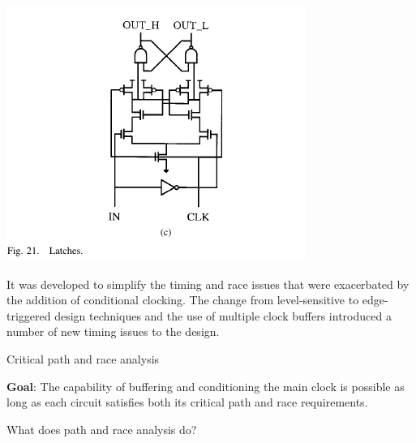 \documentclass[11pt]{article}
\begin{document}
\begin{enumerate}
\begin{center}
		\includegraphics[scale=0.5]{21264_latch.png}
	\end{center} 
	It was developed to simplify the timing and race issues that were exacerbated by the addition of conditional clocking.  The change from level-sensitive to edge-triggered design techniques and the use of multiple clock buffers introduced a number of new timing issues to the design.
\end{enumerate}

Critical path and race analysis

\textbf{Goal}: The capability of buffering and conditioning the main clock is  possible as long as each circuit satisfies both its critical path and race requirements.

What does path and race analysis do? 
\end{document}
